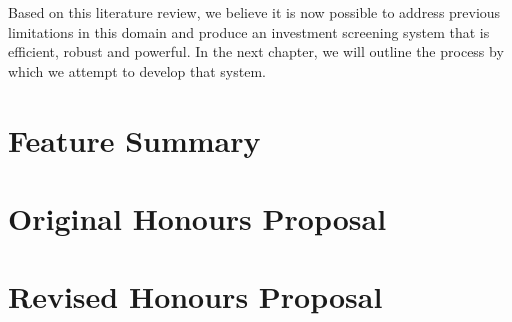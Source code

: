 \documentclass[../thesis/thesis.tex]{subfiles}
\begin{document}
\begin{refsection}
Based on this literature review, we believe it is now possible to address previous limitations in this domain and produce an investment screening system that is efficient, robust and powerful. In the next chapter, we will outline the process by which we attempt to develop that system.

\appendix

\chapter{Feature Summary}
\label{chap:appendix:feature_summary}


\printbibliography
\end{refsection}

\chapter{Original Honours Proposal}
\label{chap:appendix:original_proposal}


\chapter{Revised Honours Proposal}
\label{chap:appendix:revised_proposal}

\end{document}
